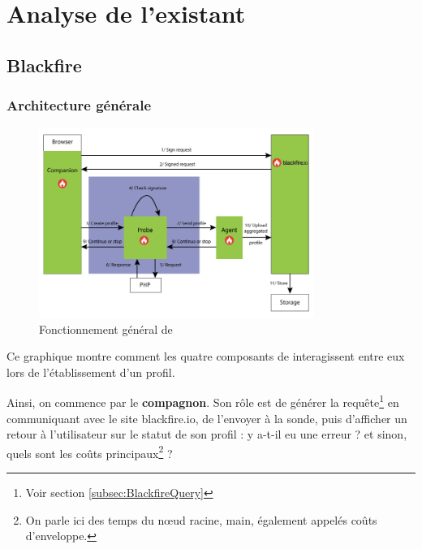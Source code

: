 \part{Analyse de l'existant}
\thispagestyle{part}
\parttoc

	\chapter{Blackfire}
	\label{chap:Blackfire}
		\section{Architecture générale}
	
\begin{figure}[!h]
\begin{center}
  \includegraphics[width=0.8\textwidth]{images/schemas/workflow/general-workflow}
  \caption{Fonctionnement général de \Blackfire}
\end{center}
\end{figure}

Ce graphique montre comment les quatre composants de \Blackfire interagissent entre eux lors de l'établissement d'un profil.
 
Ainsi, on commence par le \textbf{compagnon}. Son rôle est de générer la requête\footnote{Voir section \vref{subsec:BlackfireQuery}} en communiquant avec le site blackfire.io, de l'envoyer à la sonde, puis d'afficher un retour à l'utilisateur sur le statut de son profil : y a-t-il eu une erreur ? et sinon, quels sont les coûts principaux\footnote{On parle ici des temps du nœud racine, main, également appelés coûts d'enveloppe.} ?

